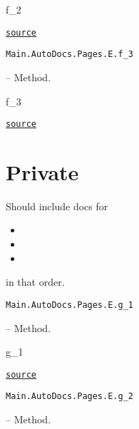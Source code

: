 \begin{adjustwidth}{2em}{0pt}

f\_2



\href{https://github.com/BambOoxX/Documenter.jl/blob/d157febde213549ed0d45c894f0651560da477d3/test/examples/pages/e.jl#L8}{\texttt{source}}


\end{adjustwidth}
\hypertarget{3503352570886681808}{\texttt{Main.AutoDocs.Pages.E.f\_3}}  -- {Method.}

\begin{adjustwidth}{2em}{0pt}

f\_3



\href{https://github.com/BambOoxX/Documenter.jl/blob/d157febde213549ed0d45c894f0651560da477d3/test/examples/pages/e.jl#L11}{\texttt{source}}


\end{adjustwidth}

\section{Private}



\label{11979819337618326564}{}


Should include docs for



\begin{itemize}
\item {}


\item {}


\item {}

\end{itemize}


in that order.


\hypertarget{18335012651218585665}{\texttt{Main.AutoDocs.Pages.E.g\_1}}  -- {Method.}

\begin{adjustwidth}{2em}{0pt}

g\_1



\href{https://github.com/BambOoxX/Documenter.jl/blob/d157febde213549ed0d45c894f0651560da477d3/test/examples/pages/e.jl#L15}{\texttt{source}}


\end{adjustwidth}
\hypertarget{12590794246865857269}{\texttt{Main.AutoDocs.Pages.E.g\_2}}  -- {Method.}

